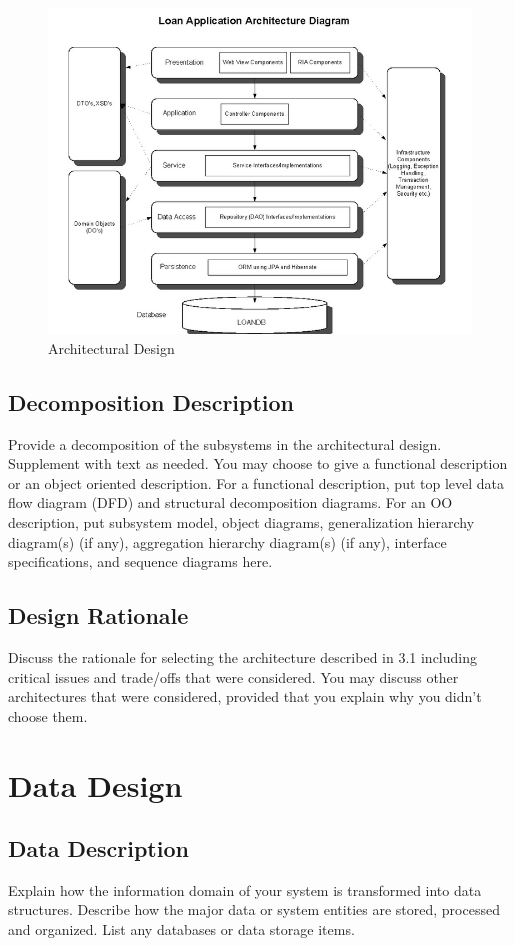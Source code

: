 \documentclass[12pt]{article}
\begin{document}
\begin{figure}[tbh]
\centering
\includegraphics[width=0.7\linewidth]{./img/image}
\caption{Architectural Design}
\label{fig:image}
\end{figure}


\subsection{Decomposition Description}
Provide a decomposition of the subsystems in the architectural design. Supplement with text 
as needed. You may choose to give a functional description or an object oriented description. For a  functional description, put top level data  flow  diagram (DFD)  and  structural 
decomposition  diagrams. For an OO description, put subsystem model, object diagrams, generalization hierarchy diagram(s) (if any), aggregation hierarchy diagram(s) (if any),
interface specifications, and sequence diagrams here.


\subsection{Design Rationale}
Discuss the rationale for selecting the architecture described in 3.1 including critical issues
and  trade/offs that were  considered. You  may discuss other  architectures that were 
considered, provided that you explain why you didn't choose them.


\section{Data Design}
\subsection{Data Description}
Explain how the information domain of your system is transformed into data structures. Describe how the major data or system entities are stored, processed and organized. List any 
databases or data storage items.
\end{document}
